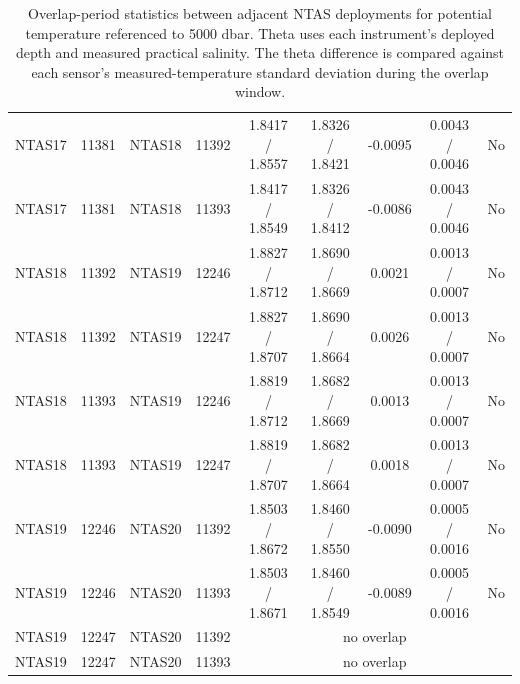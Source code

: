 \begin{table}[h]
\begin{tabular}{|c|c|c|c|c|c|c|c|c|}
NTAS17 & 11381 & NTAS18 & 11392 & 1.8417 / 1.8557 & 1.8326 / 1.8421 & -0.0095 & 0.0043 / 0.0046 & No \\
NTAS17 & 11381 & NTAS18 & 11393 & 1.8417 / 1.8549 & 1.8326 / 1.8412 & -0.0086 & 0.0043 / 0.0046 & No \\
NTAS18 & 11392 & NTAS19 & 12246 & 1.8827 / 1.8712 & 1.8690 / 1.8669 & 0.0021 & 0.0013 / 0.0007 & No \\
NTAS18 & 11392 & NTAS19 & 12247 & 1.8827 / 1.8707 & 1.8690 / 1.8664 & 0.0026 & 0.0013 / 0.0007 & No \\
NTAS18 & 11393 & NTAS19 & 12246 & 1.8819 / 1.8712 & 1.8682 / 1.8669 & 0.0013 & 0.0013 / 0.0007 & No \\
NTAS18 & 11393 & NTAS19 & 12247 & 1.8819 / 1.8707 & 1.8682 / 1.8664 & 0.0018 & 0.0013 / 0.0007 & No \\
NTAS19 & 12246 & NTAS20 & 11392 & 1.8503 / 1.8672 & 1.8460 / 1.8550 & -0.0090 & 0.0005 / 0.0016 & No \\
NTAS19 & 12246 & NTAS20 & 11393 & 1.8503 / 1.8671 & 1.8460 / 1.8549 & -0.0089 & 0.0005 / 0.0016 & No \\
NTAS19 & 12247 & NTAS20 & 11392 & \multicolumn{5}{c|}{no overlap} \\
NTAS19 & 12247 & NTAS20 & 11393 & \multicolumn{5}{c|}{no overlap} \\
\hline
\end{tabular}
\caption{Overlap-period statistics between adjacent NTAS deployments for potential temperature referenced to 5000 dbar. Theta uses each instrument's deployed depth and measured practical salinity. The theta difference is compared against each sensor's measured-temperature standard deviation during the overlap window.}
\end{table}
